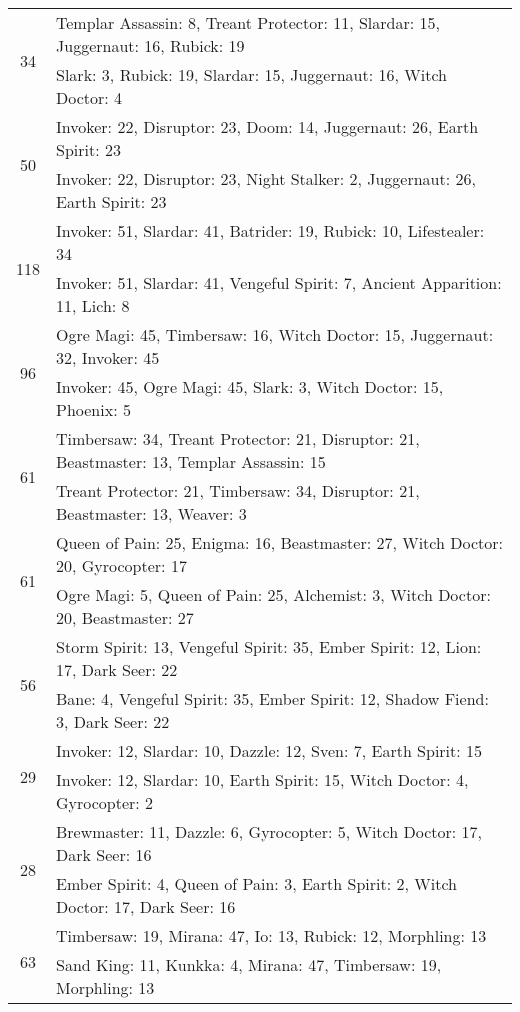 \documentclass[result.tex]{subfiles}
\begin{document}
\begin{table}[H]
\begin{tabular}{ | c | p{12.5cm} | }
\hline
\multirow{2}{*}{34}
& Templar Assassin: 8, Treant Protector: 11, Slardar: 15, Juggernaut: 16, Rubick: 19 \\
& Slark: 3, Rubick: 19, Slardar: 15, Juggernaut: 16, Witch Doctor: 4 \\
\hline
\multirow{2}{*}{50}
& Invoker: 22, Disruptor: 23, Doom: 14, Juggernaut: 26, Earth Spirit: 23 \\
& Invoker: 22, Disruptor: 23, Night Stalker: 2, Juggernaut: 26, Earth Spirit: 23 \\
\hline
\multirow{2}{*}{118}
& Invoker: 51, Slardar: 41, Batrider: 19, Rubick: 10, Lifestealer: 34 \\
& Invoker: 51, Slardar: 41, Vengeful Spirit: 7, Ancient Apparition: 11, Lich: 8 \\
\hline
\multirow{2}{*}{96}
& Ogre Magi: 45, Timbersaw: 16, Witch Doctor: 15, Juggernaut: 32, Invoker: 45 \\
& Invoker: 45, Ogre Magi: 45, Slark: 3, Witch Doctor: 15, Phoenix: 5 \\
\hline
\multirow{2}{*}{61}
& Timbersaw: 34, Treant Protector: 21, Disruptor: 21, Beastmaster: 13, Templar Assassin: 15 \\
& Treant Protector: 21, Timbersaw: 34, Disruptor: 21, Beastmaster: 13, Weaver: 3 \\
\hline
\multirow{2}{*}{61}
& Queen of Pain: 25, Enigma: 16, Beastmaster: 27, Witch Doctor: 20, Gyrocopter: 17 \\
& Ogre Magi: 5, Queen of Pain: 25, Alchemist: 3, Witch Doctor: 20, Beastmaster: 27 \\
\hline
\multirow{2}{*}{56}
& Storm Spirit: 13, Vengeful Spirit: 35, Ember Spirit: 12, Lion: 17, Dark Seer: 22 \\
& Bane: 4, Vengeful Spirit: 35, Ember Spirit: 12, Shadow Fiend: 3, Dark Seer: 22 \\
\hline
\multirow{2}{*}{29}
& Invoker: 12, Slardar: 10, Dazzle: 12, Sven: 7, Earth Spirit: 15 \\
& Invoker: 12, Slardar: 10, Earth Spirit: 15, Witch Doctor: 4, Gyrocopter: 2 \\
\hline
\multirow{2}{*}{28}
& Brewmaster: 11, Dazzle: 6, Gyrocopter: 5, Witch Doctor: 17, Dark Seer: 16 \\
& Ember Spirit: 4, Queen of Pain: 3, Earth Spirit: 2, Witch Doctor: 17, Dark Seer: 16 \\
\hline
\multirow{2}{*}{63}
& Timbersaw: 19, Mirana: 47, Io: 13, Rubick: 12, Morphling: 13 \\
& Sand King: 11, Kunkka: 4, Mirana: 47, Timbersaw: 19, Morphling: 13 \\

\end{tabular}
\end{table}
\end{document}
